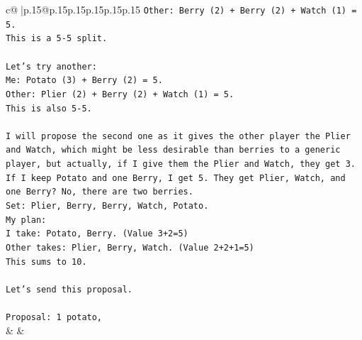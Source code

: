 \documentclass{article}
\begin{document}
{\begin{supertabular}{c@{$\;$}|p{.15\linewidth}@{}p{.15\linewidth}p{.15\linewidth}p{.15\linewidth}p{.15\linewidth}p{.15\linewidth}}
{{{\texttt{Other: Berry (2) + Berry (2) + Watch (1) = 5.} \\
\texttt{This is a 5{-}5 split.} \\
\\ 
\texttt{Let's try another:} \\
\texttt{Me: Potato (3) + Berry (2) = 5.} \\
\texttt{Other: Plier (2) + Berry (2) + Watch (1) = 5.} \\
\texttt{This is also 5{-}5.} \\
\\ 
\texttt{I will propose the second one as it gives the other player the Plier and Watch, which might be less desirable than berries to a generic player, but actually, if I give them the Plier and Watch, they get 3. If I keep Potato and one Berry, I get 5. They get Plier, Watch, and one Berry? No, there are two berries.} \\
\texttt{Set: Plier, Berry, Berry, Watch, Potato.} \\
\texttt{My plan:} \\
\texttt{I take: Potato, Berry. (Value 3+2=5)} \\
\texttt{Other takes: Plier, Berry, Watch. (Value 2+2+1=5)} \\
\texttt{This sums to 10.} \\
\\ 
\texttt{Let's send this proposal.} \\
\\ 
\texttt{Proposal: 1 potato,} \\
            }
        }
    }
    & & \\ \\


\end{supertabular}}
\end{document}
